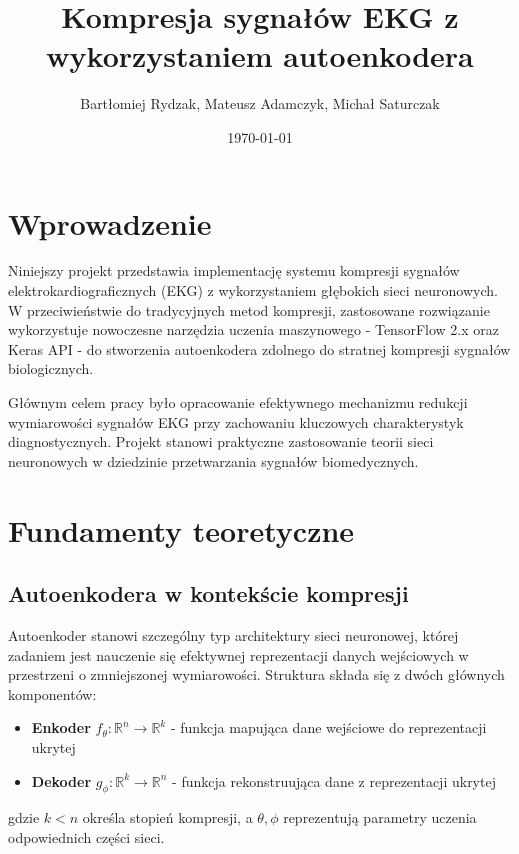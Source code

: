 \documentclass[12pt,a4paper]{article}
\title{\textbf{Kompresja sygnałów EKG z wykorzystaniem autoenkodera}}
\author{Bartłomiej Rydzak, Mateusz Adamczyk, Michał Saturczak}
\date{\today}
\begin{document}
\maketitle

\tableofcontents
\newpage

\section{Wprowadzenie}

Niniejszy projekt przedstawia implementację systemu kompresji sygnałów elektrokardiograficznych (EKG) z wykorzystaniem głębokich sieci neuronowych. W przeciwieństwie do tradycyjnych metod kompresji, zastosowane rozwiązanie wykorzystuje nowoczesne narzędzia uczenia maszynowego - TensorFlow 2.x oraz Keras API - do stworzenia autoenkodera zdolnego do stratnej kompresji sygnałów biologicznych.

Głównym celem pracy było opracowanie efektywnego mechanizmu redukcji wymiarowości sygnałów EKG przy zachowaniu kluczowych charakterystyk diagnostycznych. Projekt stanowi praktyczne zastosowanie teorii sieci neuronowych w dziedzinie przetwarzania sygnałów biomedycznych.

\section{Fundamenty teoretyczne}

\subsection{Autoenkodera w kontekście kompresji}

Autoenkoder stanowi szczególny typ architektury sieci neuronowej, której zadaniem jest nauczenie się efektywnej reprezentacji danych wejściowych w przestrzeni o zmniejszonej wymiarowości. Struktura składa się z dwóch głównych komponentów:

\begin{itemize}
    \item \textbf{Enkoder} $f_{\theta}: \mathbb{R}^n \rightarrow \mathbb{R}^k$ - funkcja mapująca dane wejściowe do reprezentacji ukrytej
    \item \textbf{Dekoder} $g_{\phi}: \mathbb{R}^k \rightarrow \mathbb{R}^n$ - funkcja rekonstruująca dane z reprezentacji ukrytej
\end{itemize}

gdzie $k < n$ określa stopień kompresji, a $\theta, \phi$ reprezentują parametry uczenia odpowiednich części sieci.
\end{document}
